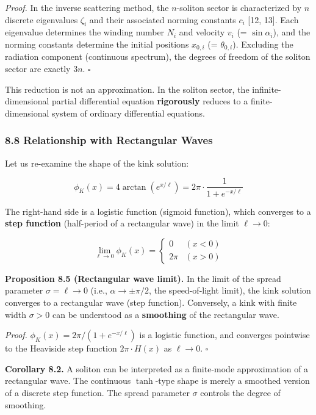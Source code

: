 \documentclass[a4paper,11pt]{article}
\begin{document}
\emph{Proof.} In the inverse scattering method, the \(n\)-soliton sector
is characterized by \(n\) discrete eigenvalues \(\zeta_i\) and their
associated norming constants \(c_i\) {[}12, 13{]}. Each eigenvalue
determines the winding number \(N_i\) and velocity \(v_i\) (=
\(\sin\alpha_i\)), and the norming constants determine the initial
positions \(x_{0,i}\) (= \(\theta_{0,i}\)). Excluding the radiation
component (continuous spectrum), the degrees of freedom of the soliton
sector are exactly \(3n\). \(\square\)

This reduction is not an approximation. In the soliton sector, the
infinite-dimensional partial differential equation \textbf{rigorously}
reduces to a finite-dimensional system of ordinary differential
equations.

\subsubsection{8.8 Relationship with Rectangular
Waves}\label{relationship-with-rectangular-waves}

Let us re-examine the shape of the kink solution:

\[\phi_K(x) = 4\arctan(e^{x/\ell}) = 2\pi \cdot \frac{1}{1 + e^{-x/\ell}}\]

The right-hand side is a logistic function (sigmoid function), which
converges to a \textbf{step function} (half-period of a rectangular
wave) in the limit \(\ell \to 0\):

\[\lim_{\ell \to 0} \phi_K(x) = \begin{cases} 0 & (x < 0) \\ 2\pi & (x > 0) \end{cases}\]

\textbf{Proposition 8.5 (Rectangular wave limit).} In the limit of the
spread parameter \(\sigma = \ell \to 0\) (i.e., \(\alpha \to \pm\pi/2\),
the speed-of-light limit), the kink solution converges to a rectangular
wave (step function). Conversely, a kink with finite width
\(\sigma > 0\) can be understood as a \textbf{smoothing} of the
rectangular wave.

\emph{Proof.} \(\phi_K(x) = 2\pi/(1 + e^{-x/\ell})\) is a logistic
function, and converges pointwise to the Heaviside step function
\(2\pi \cdot H(x)\) as \(\ell \to 0\). \(\square\)

\textbf{Corollary 8.2.} A soliton can be interpreted as a finite-mode
approximation of a rectangular wave. The continuous \(\tanh\)-type shape
is merely a smoothed version of a discrete step function. The spread
parameter \(\sigma\) controls the degree of smoothing.
\end{document}
